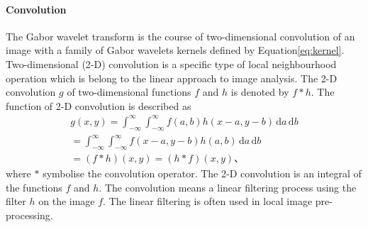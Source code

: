 \paragraph{Convolution}
The Gabor wavelet transform is the course of two-dimensional convolution of an image with a family of Gabor wavelets kernels defined by \mbox{Equation}\ref{eq:kernel}.  Two-dimensional (2-D) convolution is a specific type of local neighbourhood operation which is belong to the linear approach to image analysis. The 2-D convolution $g$ of two-dimensional functions $f$ and $h$ is denoted by $f*h$. The function of 2-D convolution is described as
\newcommand{\ud}{\mathrm{d}}
{\setlength\arraycolsep{2pt}
\begin{eqnarray}\label{eq:conv2}
 g(x, y) = \int_{-\infty}^{\infty}\int_{-\infty}^{\infty}f(a,b)h(x-a,y-b) \, \ud a \, \ud b \nonumber\\
= \int_{-\infty}^{\infty}\int_{-\infty}^{\infty}f(x-a,y-b)h(a,b) \, \ud a \, \ud b \nonumber\\
= (f*h)(x,y) = (h*f)(x,y) 、
\end{eqnarray}
} 
where $*$ symbolise the convolution operator. The 2-D convolution is an integral of the functions $f$ and $h$. The convolution means a linear filtering process using the filter $h$ on the image $f$.  The linear filtering is often used in local image pre-processing.
